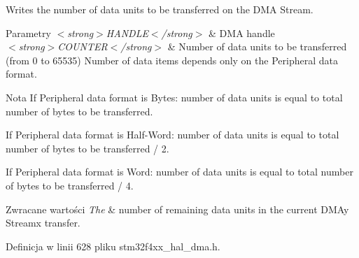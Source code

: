 Writes the number of data units to be transferred on the D\+MA Stream. 


\begin{DoxyParams}{Parametry}
{\em $<$strong$>$\+H\+A\+N\+D\+L\+E$<$/strong$>$} & D\+MA handle \\
\hline
{\em $<$strong$>$\+C\+O\+U\+N\+T\+E\+R$<$/strong$>$} & Number of data units to be transferred (from 0 to 65535) Number of data items depends only on the Peripheral data format.\\
\hline
\end{DoxyParams}
\begin{DoxyNote}{Nota}
If Peripheral data format is Bytes\+: number of data units is equal to total number of bytes to be transferred.

If Peripheral data format is Half-\/\+Word\+: number of data units is equal to total number of bytes to be transferred / 2.

If Peripheral data format is Word\+: number of data units is equal to total number of bytes to be transferred / 4.
\end{DoxyNote}

\begin{DoxyRetVals}{Zwracane wartości}
{\em The} & number of remaining data units in the current D\+M\+Ay Streamx transfer. \\
\hline
\end{DoxyRetVals}


Definicja w linii 628 pliku stm32f4xx\+\_\+hal\+\_\+dma.\+h.

